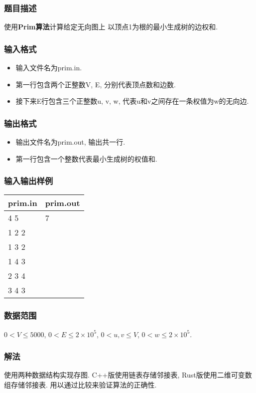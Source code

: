 \subsubsection{题目描述}
使用\textbf{Prim算法}计算给定无向图上  以顶点1为根的最小生成树的边权和.
\subsubsection{输入格式}
\begin{itemize}
	\item 输入文件名为prim.in.
	\item 第一行包含两个正整数V, E, 分别代表顶点数和边数.
	\item 接下来E行包含三个正整数u, v, w, 代表u和v之间存在一条权值为w的无向边.
\end{itemize}

\subsubsection{输出格式}
\begin{itemize}
	\item 输出文件名为prim.out, 输出共一行.
	\item 第一行包含一个整数代表最小生成树的权值和.
\end{itemize}

\subsubsection{输入输出样例}
\label{sec:iosample}
\begin{table}[h!]
	\centering
	\begin{tabular}{|l|l|}
		\hline
		prim.in & prim.out \\
		\hline
		4 5     & 7        \\
		1 2 2   & ~        \\
		1 3 2   & ~        \\
		1 4 3   & ~        \\
		2 3 4   & ~        \\
		3 4 3   & ~        \\
		\hline
	\end{tabular}
\end{table}

\subsubsection{数据范围}
$0 < V \leq 5000$,
$0 < E \leq 2\times 10^5$,
$0 < u,v \leq V$,
$0 < w \leq 2\times 10^5$.

\subsubsection{解法}
使用两种数据结构实现存图. C++版使用链表存储邻接表,
Rust版使用二维可变数组存储邻接表. 用以通过比较来验证算法的正确性.

